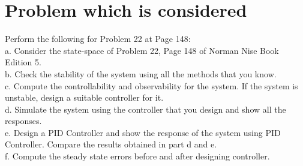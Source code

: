 \documentclass{article}
\begin{document}

\begin{flushleft}
\end{flushleft}

\tableofcontents
\newpage

\section{Problem which is considered}
\noindent Perform the following for Problem 22 at Page 148:\\
a. Consider the state-space of Problem 22, Page 148 of Norman Nise Book Edition 5. \\
b. Check the stability of the system using all the methods that you know. \\
c. Compute the controllability and observability for the system. If the system is unstable, design a suitable controller for it. \\
d. Simulate the system using the controller that you design and show all the responses.\\
e. Design a PID Controller and show the response of the system using PID Controller. Compare the results obtained in part d and e.\\
f. Compute the steady state errors before and after designing controller.\\
\end{document}
